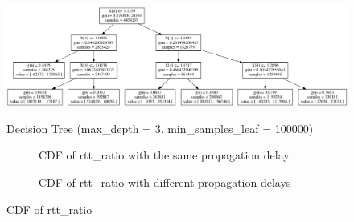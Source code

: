 \begin{figure}
\centering
  \includegraphics[width=\textwidth,height=4cm]{tree.png}
  \caption{Decision Tree (max\_depth = 3, min\_samples\_leaf = 100000)}
  \label{DT}
\end{figure}

\begin{figure}[!htb]\centering
   \begin{subfigure}{0.49\textwidth}
\caption{CDF of rtt\_ratio with the same propagation delay}
\label{CDFrtt}

   \end{subfigure}
   \begin {subfigure}{0.49\textwidth}
\caption{CDF of rtt\_ratio with different propagation delays}
\label{CDFrttDiff}
   \end{subfigure}
\caption{CDF of rtt\_ratio}
\label{fig:cdf1}
\end{figure}




